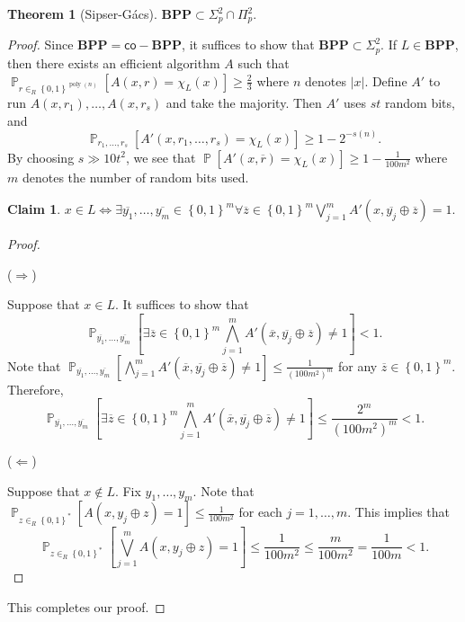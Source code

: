 \documentclass[10pt,letterpaper,cm]{nupset}
\theoremstyle{definition}
\theoremstyle{theorem}
\newtheorem{theorem}[definition]{Theorem}
\newtheorem*{claim}{Claim}
\theoremstyle{remark}
\newcommand{\1}{\mathbf{1}}
\newcommand{\0}{\vec 0}
\DeclareMathOperator{\pr}{\mathbb{P}}
\DeclareMathOperator{\poly}{poly}
\begin{document}
\begin{theorem}[Sipser-G\'acs]
$\mathbf{BPP} \subset \Sigma^2_p \cap \Pi^2_p$.
\end{theorem}
\begin{proof}
Since $\mathbf{BPP} = \mathsf{co}{-}\mathbf{BPP}$, it suffices to show that $\mathbf{BPP} \subset \Sigma^2_p$. If $L \in \mathbf{BPP}$, then there exists an efficient algorithm $A$ such that $\pr_{r \in_R \left\{0,1\right\}^{\poly(n)}}\left[A(x,r) = \chi_L(x)\right] \geq \frac{2}{3}$ where $n$ denotes $\left\lvert{x}\right\rvert$. Define $A'$ to run $A(x, r_1), \ldots, A(x, r_s)$ and take the majority. Then $A'$ uses $st$ random bits, and $$\pr_{r_1, \ldots, r_s}\left[A'(x, r_1, \ldots, r_s) =\chi_L(x)\right] \geq 1 - 2^{{-}s(n)}.$$ By choosing $s \gg 10t^2$, we see that $\pr\left[A'(x, \overline{r}) = \chi_L(x)\right] \geq 1 -\frac{1}{100m^2}$ where $m$ denotes the number of random bits used. 
\begin{claim}
$x \in L \iff \exists \overline{y_1}, \ldots, \overline{y_m} \in \left\{0,1\right\}^m \forall \overline{z} \in \left\{0,1\right\}^m \bigvee_{j=1}^m A'\left(x, \overline{y_j} \oplus \overline{z}\right)=1$.
\end{claim}

\begin{proof} $ $

\smallskip

($\Longrightarrow$) 

\smallskip

Suppose that $x \in L$. It suffices to show that $$   \pr_{\overline{y_1}, \ldots, \overline{y_m}} \left[\exists \overline{z} \in \left\{0,1\right\}^m \bigwedge_{j=1}^m A'\left(\overline{x}, \overline{y_j} \oplus \overline{z}\right) \ne 1 \right] <1   .$$ Note that $\pr_{\overline{y_1}, \ldots, \overline{y_m}} \left[\bigwedge_{j=1}^m  A'\left(\overline{x}, \overline{y_j} \oplus \overline{z}\right) \ne 1 \right] \leq \frac{1}{\left(100m^2\right)^m}$ for any $\overline{z} \in \left\{0,1\right\}^m$. Therefore, $$      \pr_{\overline{y_1}, \ldots, \overline{y_m}}  \left[\exists \overline{z} \in \left\{0,1\right\}^m \bigwedge_{j=1}^m A'\left(\overline{x}, \overline{y_j} \oplus \overline{z}\right) \ne 1 \right ]   \leq \frac{2^m}{(100m^2)^m} <1.$$

\medskip

($\Longleftarrow$)  

\smallskip

Suppose that $x \notin L$. Fix $y_1, \ldots, y_m$. Note that $\pr_{z \in_R \left\{0,1\right\}^{\ast}}[A(x, y_j \oplus z) =1] \leq \frac{1}{100m^2}$ for each $j=1, \ldots, m$. This implies that $$\pr_{z \in_R \left\{0,1\right\}^{\ast}}\left[\bigvee_{j=1}^m A(x, y_j \oplus z) =1\right] \leq \frac{1}{100m^2} \leq \frac{m}{100m^2} = \frac{1}{100m} <1.$$
\end{proof}
This completes our proof.
\end{proof}
\end{document}

